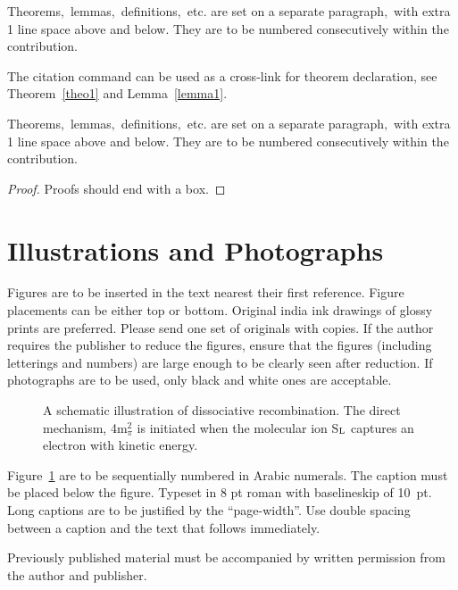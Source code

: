 \documentclass{ws-ijcm}
\begin{document}
\begin{theorem}
\label{theo1}
Theorems$,$ lemmas$,$ definitions$,$ etc. are set on a separate 
paragraph$,$ with extra 1 line space above and below. They are to be
numbered consecutively within the contribution.
\end{theorem}

The citation command can be used as a cross-link for theorem 
declaration, see Theorem~\ref{theo1} and Lemma~\ref{lemma1}.

\begin{lemma}
\label{lemma1}
Theorems$,$ lemmas$,$ definitions$,$ etc. are set on a separate 
paragraph$,$ with extra 1 line space above and below. They are to be
numbered consecutively within the contribution.
\end{lemma}

\begin{proof}
Proofs should end with a box.
\end{proof}

\section{Illustrations and Photographs}
Figures are to be inserted in the text nearest their first
reference.  Figure placements can be either top or bottom.
Original india ink drawings of glossy prints are
preferred. Please send one set of originals with copies. If the
author requires the publisher to reduce the figures, ensure that
the figures (including letterings and numbers) are large enough
to be clearly seen after reduction. If photographs are to be
used, only black and white ones are acceptable.

\begin{figure}[th]
\centerline{}
\vspace*{8pt}
\caption{A schematic illustration of dissociative recombination. The
direct mechanism, 4m$^2_\pi$ is initiated when the molecular ion
S$_{\rm L}$ captures an electron with kinetic energy.\label{one}}
\end{figure}

Figure~\ref{one} are to be sequentially numbered in Arabic
numerals. The caption must be placed below the figure. Typeset in 8 pt  
roman with baselineskip of 10~pt. Long captions are to be justified by
the ``page-width''.  Use double spacing between a caption and the text
that follows immediately.

Previously published material must be accompanied by written
permission from the author and publisher.
\end{document}
